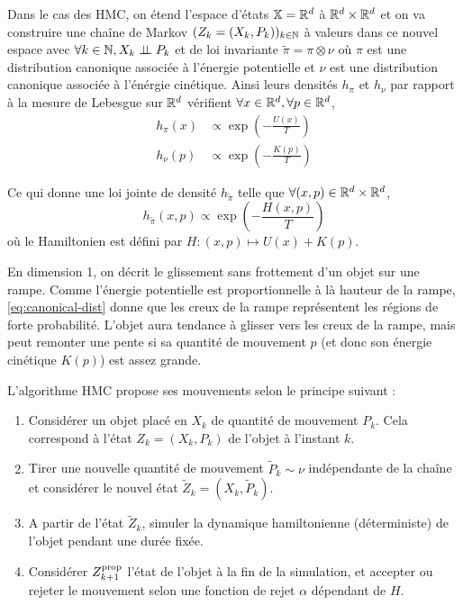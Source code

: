 \documentclass[10pt,a4paper]{article}
\begin{document}
Dans le cas des HMC, on étend l'espace d'états $\mathbb{X} = \mathbb{R}^d$ à $\mathbb{R}^d \times \mathbb{R}^d$ et on va construire une chaîne de Markov $(Z_k = (X_k, P_k))_{k \in \mathbb{N}}$ à valeurs dans ce nouvel espace avec $\forall k \in \mathbb{N}, X_k \perp\!\!\!\perp P_k$ et de loi invariante $\widetilde{\pi} = \pi \otimes \nu$ où $\pi$ est une distribution canonique associée à l'énergie potentielle et $\nu$ est une distribution canonique associée à l'énérgie cinétique. Ainsi leurs densités $h_\pi$ et $h_\nu$ par rapport à la mesure de Lebesgue sur $\mathbb{R}^d$ vérifient $\forall x \in \mathbb{R}^d, \forall p \in \mathbb{R}^d$,
\begin{align*}
	h_\pi(x) & \propto  \exp \left( -\frac{U(x)}{T} \right) \\
	h_\nu(p) & \propto  \exp \left( -\frac{K(p)}{T} \right)
\end{align*}

Ce qui donne une loi jointe de densité $h_{\widetilde{\pi}}$ telle que $\forall (x,p) \in \mathbb{R}^d \times \mathbb{R}^d$, 
\begin{equation} \label{eq:canonical-dist}
	h_{\widetilde{\pi}}(x,p) \propto \exp \left( -\frac{H(x,p)}{T} \right)
\end{equation}
où le Hamiltonien est défini par $H : (x,p) \mapsto U(x) + K(p)$.

\begin{Rque}
	En dimension 1, on décrit le glissement sans frottement d'un objet sur une rampe. Comme l'énergie potentielle est proportionnelle à là hauteur de la rampe, \eqref{eq:canonical-dist} donne que les creux de la rampe représentent les régions de forte probabilité. L'objet aura tendance à glisser vers les creux de la rampe, mais peut remonter une pente si sa quantité de mouvement $p$ (et donc son énergie cinétique $K(p)$) est assez grande.
\end{Rque}

L'algorithme HMC propose ses mouvements selon le principe suivant : 
\begin{enumerate}
	\item Considérer un objet placé en $X_k$ de quantité de mouvement $P_k$. Cela correspond à l'état $Z_k = (X_k, P_k)$ de l'objet à l'instant $k$.
	\item Tirer une nouvelle quantité de mouvement $\tilde{P}_k \sim \nu$ indépendante de la chaîne et considérer le nouvel état $\tilde{Z}_k = (X_k, \tilde{P}_k)$. 
	\item A partir de l'état $\tilde{Z}_k$, simuler la dynamique hamiltonienne (déterministe) de l'objet pendant une durée fixée.
	\item Considérer $Z_{k+1}^{\rm prop}$ l'état de l'objet à la fin de la simulation, et accepter ou rejeter le mouvement selon une fonction de rejet $\alpha$ dépendant de $H$. 
\end{enumerate}
\end{document}
